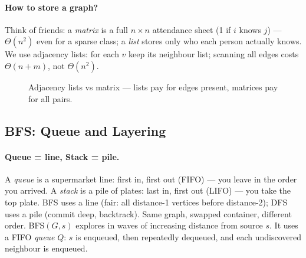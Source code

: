 \paragraph{How to store a graph?} Think of friends: a \emph{matrix} is a full $n\times n$ attendance sheet (1 if $i$ knows $j$) --- $\Theta(n^2)$ even for a sparse class; a \emph{list} stores only who each person actually knows. We use adjacency lists: for each $v$ keep its neighbour list; scanning all edges costs $\Theta(n+m)$, not $\Theta(n^2)$.
\begin{figure}[h]\centering{}\caption{Adjacency lists vs matrix --- lists pay for edges present, matrices pay for all pairs.}\label{fig:adj-storage}\end{figure}

\subsection{BFS: Queue and Layering}
\paragraph{Queue = line, Stack = pile.} A \emph{queue} is a supermarket line: first in, first out (FIFO) --- you leave in the order you arrived. A \emph{stack} is a pile of plates: last in, first out (LIFO) --- you take the top plate. BFS uses a line (fair: all distance-1 vertices before distance-2); DFS uses a pile (commit deep, backtrack). Same graph, swapped container, different order.
\textsc{BFS}$(G,s)$ explores in waves of increasing distance from source $s$.
It uses a FIFO \emph{queue} $Q$: $s$ is enqueued, then repeatedly dequeued, and each undiscovered neighbour is enqueued.

